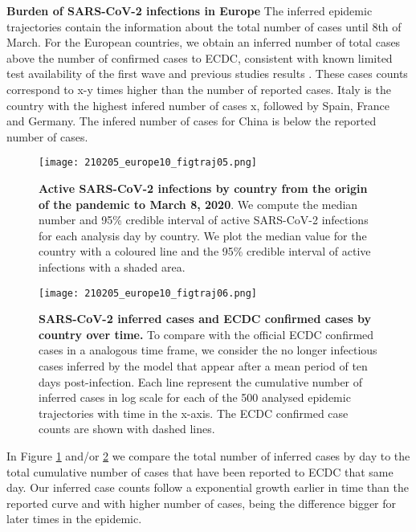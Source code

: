 \textbf{Burden of SARS-CoV-2 infections in Europe}
The inferred epidemic trajectories contain the information about the total number of cases until 8th of March. For the European countries, we obtain an inferred number of total cases above the number of confirmed cases to ECDC, consistent with known limited test availability of the first wave and  previous studies results \cite{Li2020} \cite{Wu2020}. These cases counts correspond to  x-y times higher than the number of reported cases. Italy is the country with the highest infered number of cases x, followed by Spain, France and Germany. The infered number of cases for China is below the reported number of cases. \\


\begin{figure}[ht]
    \centering
    \texttt{[image: 210205\_europe10\_figtraj05.png]}
    \caption{\textbf{Active SARS-CoV-2 infections by country from the origin of the pandemic to March 8, 2020}. We compute the median number and 95\%  credible interval of active SARS-CoV-2 infections for each analysis day by country. We plot the median value for the country with a coloured line and the 95\% credible interval of active infections with a shaded area.}
    \label{fig:gribbon}
\end{figure}


\begin{figure}[p]
    \centering
    \texttt{[image: 210205\_europe10\_figtraj06.png]}
    \caption{\textbf{SARS-CoV-2 inferred cases and ECDC confirmed cases by country over time.} To compare with the official ECDC confirmed cases in a analogous time frame, we consider the no longer infectious cases inferred by the model that appear after a mean period of ten days post-infection. Each line represent the cumulative number of inferred cases in log scale for each of the 500 analysed epidemic trajectories with time in the x-axis. The ECDC confirmed case counts are shown with dashed lines.}
    \label{fig:trajs}
\end{figure}


In Figure \ref{fig:gribbon} and/or \ref{fig:trajs} we compare the total number of inferred cases by day to the total cumulative number of cases that have been reported to ECDC that same day. Our inferred case counts follow a exponential growth earlier in time than the reported curve and with higher number of cases, being the difference bigger for later times in the epidemic.\\


